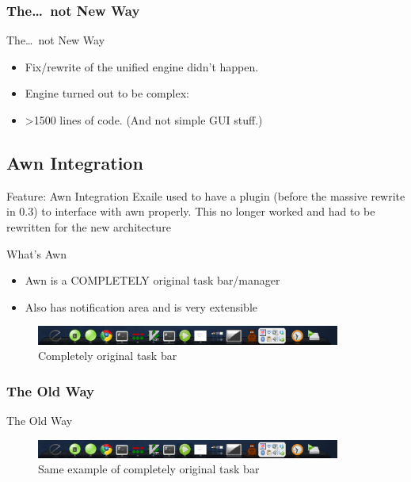 \documentclass{beamer}
\begin{document}
\subsubsection{The\ldots\ not New Way}
\begin{frame}{The\ldots\ not New Way}
  \begin{itemize}
    \item Fix/rewrite of the unified engine didn't happen.
	\item Engine turned out to be complex:
	\item \textgreater 1500 lines of code. (And not simple GUI stuff.)
  \end{itemize}
\end{frame}


\subsection{Awn Integration}
\begin{frame}{Feature: Awn Integration}
Exaile used to have a plugin (before the massive rewrite in 0.3) to interface
with awn properly. This no longer worked and had to be rewritten for the new
architecture
\end{frame}

\begin{frame}{What's Awn}
  \begin{itemize}
    \item Awn is a COMPLETELY original task bar/manager
    \item Also has notification area and is very extensible
  \end{itemize}
  \begin{figure}
    \centering
    \includegraphics[width=100mm]{images/awn}
    \caption{Completely original task bar}
  \end{figure}
\end{frame}

\subsubsection{The Old Way}
\begin{frame}{The Old Way}
  \begin{figure}
    \centering
    \includegraphics[width=100mm]{images/awn}
    \caption{Same example of completely original task bar}
  \end{figure}
\end{frame}
\end{document}
